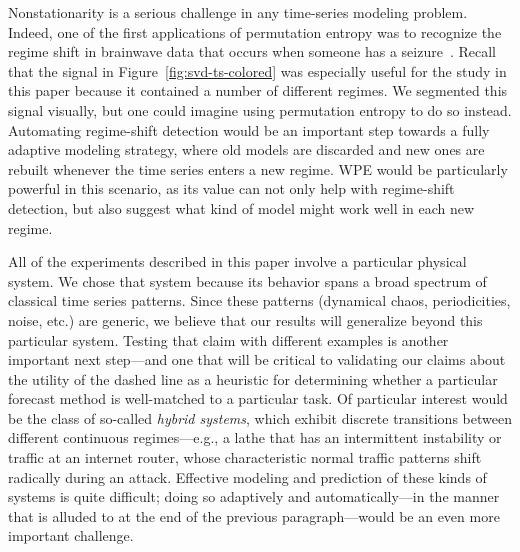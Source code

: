Nonstationarity is a serious challenge in any time-series modeling
problem.  Indeed, one of the first applications of permutation entropy
was to recognize the regime shift in brainwave data that occurs when
someone has a seizure~\cite{cao2004det}.  Recall that the signal in
Figure~\ref{fig:svd-ts-colored} was especially useful for the study in
this paper because it contained a number of different regimes.  We
segmented this signal visually, but one could imagine using
permutation entropy to do so instead.  Automating regime-shift
detection would be an important step towards a fully adaptive modeling
strategy, where old models are discarded and new ones are rebuilt
whenever the time series enters a new regime.  WPE would be
particularly powerful in this scenario, as its value can not only help
with regime-shift detection, but also suggest what kind of model might
work well in each new regime.

All of the experiments described in this paper involve a particular
physical system.  We chose that system because its behavior spans a
broad spectrum of classical time series patterns.  Since these
patterns (dynamical chaos, periodicities, noise, etc.) are generic, we
believe that our results will generalize beyond this particular
system.  Testing that claim with different examples is another
important next step---and one that will be critical to validating our
claims about the utility of the dashed line as a heuristic for
determining whether a particular forecast method is well-matched to a
particular task.  Of particular interest would be the class of
so-called \emph{hybrid systems}, which exhibit discrete transitions
between different continuous regimes---e.g., a lathe that has an
intermittent instability or traffic at an internet router, whose
characteristic normal traffic patterns shift radically during an
attack.  Effective modeling and prediction of these kinds of systems
is quite difficult; doing so adaptively and automatically---in the
manner that is alluded to at the end of the previous paragraph---would
be an even more important challenge.

